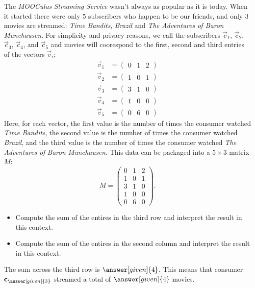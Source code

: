 \documentclass{ximera}
\begin{document}
\begin{example}
  The \textit{MOOCulus Streaming Service} wasn't always as popular as
  it is today. When it started there were only $5$ subscribers who
  happen to be our friends, and only $3$ movies are streamed:
  \textit{Time Bandits}, \textit{Brazil} and \textit{The Adventures of Baron
    Munchausen}. For simplicity and privacy reasons, we call the
  subscribers $\vec c_1$, $\vec c_2$, $\vec c_3$, $\vec c_4$, and
  $\vec c_5$ and movies will coorespond to the first, second and third
  entries of the vectors $\vec v_i$:
  \begin{align*}
   \vec v_{1} &= \begin{pmatrix}0 & 1 & 2\end{pmatrix}\\
   \vec v_{2} &= \begin{pmatrix}1 & 0 & 1\end{pmatrix}\\
   \vec v_{3} &= \begin{pmatrix}3 & 1 & 0\end{pmatrix}\\
   \vec v_{4} &= \begin{pmatrix}1 & 0 & 0\end{pmatrix}\\
   \vec v_{5} &= \begin{pmatrix}0 & 6 & 0\end{pmatrix}
  \end{align*}
  Here, for each vector, the first value is the number of times the
  consumer watched \textit{Time Bandits}, the second value is the
  number of times the consumer watched \textit{Brazil}, and the third
  value is the number of times the consumer watched \textit{The
    Adventures of Baron Munchausen}.  This data can be packaged into a
  $5 \times 3$ matrix $M$:
  \[
    M =
    \begin{pmatrix}
      0 & 1 & 2\\
      1 & 0 & 1\\
      3 & 1 & 0\\
      1 & 0 & 0\\
      0 & 6 & 0
    \end{pmatrix}.
    \]
    \begin{itemize}
    \item Compute the sum of the entires in the third row and interpret the result in this context.
    \item Compute the sum of the entires in the second column and interpret the result in this context.
    \end{itemize}
    \begin{explanation}
      The sum across the third row is $\answer[given]{4}$. This means
      that consumer $\vec{c}_{\answer[given]{3}}$ streamed a total of  $\answer[given]{4}$  movies.



\end{explanation}
\end{example}
\end{document}

